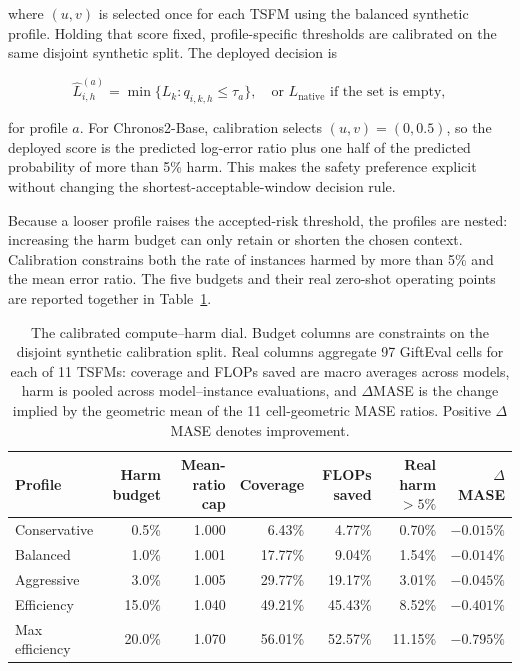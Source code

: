 where $(u,v)$ is selected once for each TSFM using the balanced synthetic
profile.  Holding that score fixed, profile-specific thresholds are calibrated
on the same disjoint synthetic split.  The deployed decision is

\begin{equation}
    \widehat L_{i,h}^{(a)}
      = \min\{L_k:q_{i,k,h}\leq\tau_a\},
    \quad\text{or }L_{\mathrm{native}}\text{ if the set is empty},
    \label{eq:risk-selection}
\end{equation}

for profile $a$.  For Chronos2-Base, calibration selects $(u,v)=(0,0.5)$, so
the deployed score is the predicted log-error ratio plus one half of the
predicted probability of more than 5\% harm.  This makes the safety preference
explicit without changing the shortest-acceptable-window decision rule.

Because a looser profile raises the accepted-risk threshold,
the profiles are nested: increasing the harm budget can only retain or shorten
the chosen context.  Calibration constrains both the rate of instances harmed
by more than 5\% and the mean error ratio.  The five budgets and their real
zero-shot operating points are reported together in
Table~\ref{tab:risk-profiles}.

\begin{table}[t]
    \centering
    \footnotesize
    \renewcommand{\arraystretch}{1.12}
    \caption{The calibrated compute--harm dial.  Budget columns are constraints
    on the disjoint synthetic calibration split.  Real columns aggregate 97
    GiftEval cells for each of 11 TSFMs: coverage and FLOPs saved are macro
    averages across models, harm is pooled across model--instance evaluations,
    and $\Delta$MASE is the change implied by the geometric mean of the 11
    cell-geometric MASE ratios.  Positive $\Delta$MASE denotes improvement.}
    \label{tab:risk-profiles}
    \begin{tabular*}{\textwidth}{@{\extracolsep{\fill}}lrrrrrr@{}}
        \toprule
        Profile & Harm budget & Mean-ratio cap & Coverage & FLOPs saved & Real harm $>5\%$ & $\Delta$MASE \\
        \midrule
        Conservative   & 0.5\% & 1.000 &  6.43\% &  4.77\% & 0.70\% & $-0.015\%$ \\
        Balanced       & 1.0\% & 1.001 & 17.77\% &  9.04\% & 1.54\% & $-0.014\%$ \\
        Aggressive     & 3.0\% & 1.005 & 29.77\% & 19.17\% & 3.01\% & $-0.045\%$ \\
        \addlinespace[2pt]
        Efficiency      & 15.0\% & 1.040 & 49.21\% & 45.43\% & 8.52\% & $-0.401\%$ \\
        Max efficiency  & 20.0\% & 1.070 & 56.01\% & 52.57\% & 11.15\% & $-0.795\%$ \\
        \bottomrule
    \end{tabular*}
\end{table}

